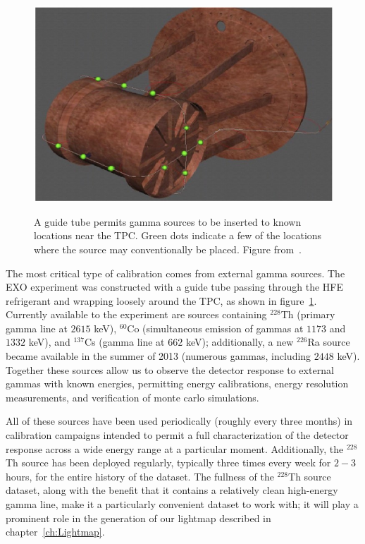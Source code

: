 \begin{figure}
\begin{center}
\includegraphics[keepaspectratio=true,width=\textwidth]{calibration_tube.jpg}
\end{center}
\renewcommand{\baselinestretch}{1}
\small\normalsize
\begin{quote}
\caption{A guide tube permits gamma sources to be inserted to known locations near the TPC.  Green dots indicate a few of the locations where the source may conventionally be placed.  Figure from~\cite{detectorPartI}.}
\label{fig:CalibrationGuideTube}
\end{quote}
\end{figure}
\renewcommand{\baselinestretch}{2}
\small\normalsize

The most critical type of calibration comes from external gamma sources.  The EXO experiment was constructed with a guide tube passing through the HFE refrigerant and wrapping loosely around the TPC, as shown in figure~\ref{fig:CalibrationGuideTube}.  Currently available to the experiment are sources containing $^{228}$Th (primary gamma line at $2615$ keV), $^{60}$Co (simultaneous emission of gammas at $1173$ and $1332$ keV), and $^{137}$Cs (gamma line at $662$ keV); additionally, a new $^{226}$Ra source became available in the summer of 2013 (numerous gammas, including $2448$ keV).  Together these sources allow us to observe the detector response to external gammas with known energies, permitting energy calibrations, energy resolution measurements, and verification of monte carlo simulations.

All of these sources have been used periodically (roughly every three months) in calibration campaigns intended to permit a full characterization of the detector response across a wide energy range at a particular moment.  Additionally, the $^{228}$Th source has been deployed regularly, typically three times every week for $2-3$ hours, for the entire history of the dataset.  The fullness of the $^{228}$Th source dataset, along with the benefit that it contains a relatively clean high-energy gamma line, make it a particularly convenient dataset to work with; it will play a prominent role in the generation of our lightmap described in chapter~\ref{ch:Lightmap}.

